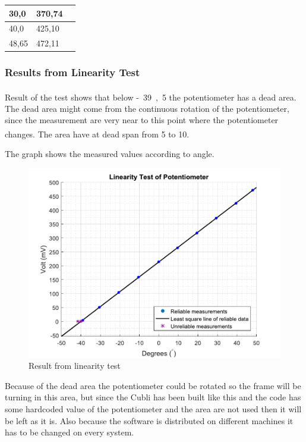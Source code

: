 \begin{table}[H]
\begin{tabular}{|l|l|p{4.3cm}|}
		30,0                              			  & 370,74               \\
		\hline%
		40,0                                          & 425,10               \\
		\hline%
		48,65 										  & 472,11               \\
		\hline%
	\end{tabular}
\end{table}


\subsubsection{Results from Linearity Test}
Result of the test shows that below \si{-39,5^{\circ}} the potentiometer has a dead area. The dead area might come from the continuous rotation of the potentiometer, since the measurement are very near to this point where the potentiometer changes. The area have at dead span from \si{5^{\circ}} to \si{10^{\circ}}.

The graph shows the measured values according to angle.

\begin{figure}[H] 
	\centering 
	\includegraphics[scale=0.7]{figures/linearityOfPotmeterTest2-1}
	\caption{Result from linearity test}
	\label{linearityOfPotmeterTest2-1}
\end{figure}
Because of the dead area the potentiometer could be rotated so the frame will be turning in this area, but since the Cubli has been built like this and the code has some hardcoded value of the potentiometer and the area are not used then it will be left as it is. Also because the software is distributed on different machines it has to be changed on every system.


